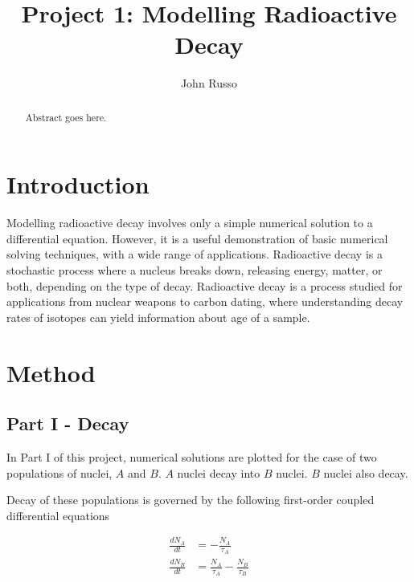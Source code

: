 \documentclass[pra,twocolumn,showpacs,amsmath,amssymb]{revtex4-1}
\begin{document}
\newcommand{\trel}{$\tau_A / \tau_B$}

\title{Project 1: Modelling Radioactive Decay}


\author{John Russo}

\begin{abstract}
Abstract goes here.
\end{abstract}

\pacs{}


\maketitle





\section{Introduction} \label{sec:intro}

Modelling radioactive decay involves only a simple numerical solution to a
differential equation. However, it is a useful demonstration of basic numerical
solving techniques, with a wide range of applications.
Radioactive decay is a stochastic process where a nucleus breaks down, releasing
energy, matter, or both, depending on the type of decay.
Radioactive decay is a process studied for applications from nuclear weapons to
carbon dating, where understanding decay rates of isotopes can yield information
about age of a sample.





\section{Method}

\subsection{Part I - Decay}


In Part I of this project, numerical solutions are plotted for the case of two
populations of nuclei, $A$ and $B$. $A$ nuclei decay into $B$ nuclei. $B$
nuclei also decay.

Decay of these populations is governed by the following first-order coupled
differential equations

\begin{align}
  \frac{d N_A}{dt} &= -\frac{N_A}{\tau_A} \\
  \frac{d N_B}{dt} &= \frac{N_A}{\tau_A} - \frac{N_B}{\tau_B}
\end{align}
\end{document}

